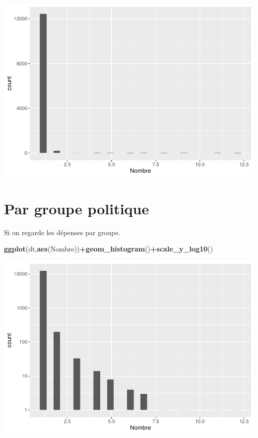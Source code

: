 \documentclass[
]{book}
\newenvironment{Shaded}{\begin{snugshade}}{\end{snugshade}}
\newcommand{\FunctionTok}[1]{\textcolor[rgb]{0.13,0.29,0.53}{\textbf{#1}}}
\newcommand{\NormalTok}[1]{#1}
\newcommand{\SpecialCharTok}[1]{\textcolor[rgb]{0.81,0.36,0.00}{\textbf{#1}}}
\begin{document}
\includegraphics{_main_files/figure-latex/reserve2-1.pdf}

\hypertarget{par-groupe-politique}{%
\section{Par groupe politique}\label{par-groupe-politique}}

Si on regarde les dépenses par groupe.

\begin{Shaded}
\begin{Highlighting}[]
\FunctionTok{ggplot}\NormalTok{(dt,}\FunctionTok{aes}\NormalTok{(Nombre))}\SpecialCharTok{+}\FunctionTok{geom\_histogram}\NormalTok{()}\SpecialCharTok{+}\FunctionTok{scale\_y\_log10}\NormalTok{()}
\end{Highlighting}
\end{Shaded}

\includegraphics{_main_files/figure-latex/reserve3-1.pdf}
\end{document}
